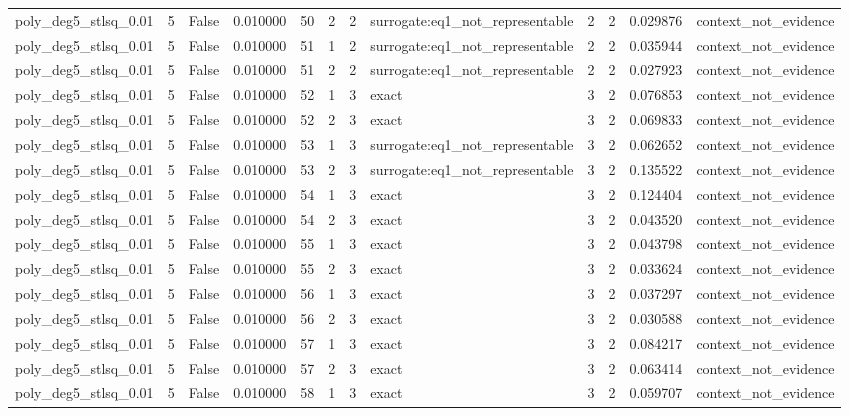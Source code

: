 \begin{tabular}{lrrrrrrlrrrl}
poly\_deg5\_stlsq\_0.01 & 5 & False & 0.010000 & 50 & 2 & 2 & surrogate:eq1\_not\_representable & 2 & 2 & 0.029876 & context\_not\_evidence \\
poly\_deg5\_stlsq\_0.01 & 5 & False & 0.010000 & 51 & 1 & 2 & surrogate:eq1\_not\_representable & 2 & 2 & 0.035944 & context\_not\_evidence \\
poly\_deg5\_stlsq\_0.01 & 5 & False & 0.010000 & 51 & 2 & 2 & surrogate:eq1\_not\_representable & 2 & 2 & 0.027923 & context\_not\_evidence \\
poly\_deg5\_stlsq\_0.01 & 5 & False & 0.010000 & 52 & 1 & 3 & exact & 3 & 2 & 0.076853 & context\_not\_evidence \\
poly\_deg5\_stlsq\_0.01 & 5 & False & 0.010000 & 52 & 2 & 3 & exact & 3 & 2 & 0.069833 & context\_not\_evidence \\
poly\_deg5\_stlsq\_0.01 & 5 & False & 0.010000 & 53 & 1 & 3 & surrogate:eq1\_not\_representable & 3 & 2 & 0.062652 & context\_not\_evidence \\
poly\_deg5\_stlsq\_0.01 & 5 & False & 0.010000 & 53 & 2 & 3 & surrogate:eq1\_not\_representable & 3 & 2 & 0.135522 & context\_not\_evidence \\
poly\_deg5\_stlsq\_0.01 & 5 & False & 0.010000 & 54 & 1 & 3 & exact & 3 & 2 & 0.124404 & context\_not\_evidence \\
poly\_deg5\_stlsq\_0.01 & 5 & False & 0.010000 & 54 & 2 & 3 & exact & 3 & 2 & 0.043520 & context\_not\_evidence \\
poly\_deg5\_stlsq\_0.01 & 5 & False & 0.010000 & 55 & 1 & 3 & exact & 3 & 2 & 0.043798 & context\_not\_evidence \\
poly\_deg5\_stlsq\_0.01 & 5 & False & 0.010000 & 55 & 2 & 3 & exact & 3 & 2 & 0.033624 & context\_not\_evidence \\
poly\_deg5\_stlsq\_0.01 & 5 & False & 0.010000 & 56 & 1 & 3 & exact & 3 & 2 & 0.037297 & context\_not\_evidence \\
poly\_deg5\_stlsq\_0.01 & 5 & False & 0.010000 & 56 & 2 & 3 & exact & 3 & 2 & 0.030588 & context\_not\_evidence \\
poly\_deg5\_stlsq\_0.01 & 5 & False & 0.010000 & 57 & 1 & 3 & exact & 3 & 2 & 0.084217 & context\_not\_evidence \\
poly\_deg5\_stlsq\_0.01 & 5 & False & 0.010000 & 57 & 2 & 3 & exact & 3 & 2 & 0.063414 & context\_not\_evidence \\
poly\_deg5\_stlsq\_0.01 & 5 & False & 0.010000 & 58 & 1 & 3 & exact & 3 & 2 & 0.059707 & context\_not\_evidence \\

\end{tabular}
